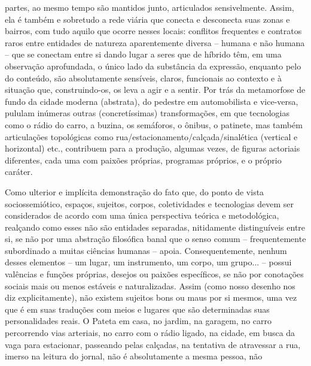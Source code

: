 \begin{multicols}{2}
partes,\allowbreak{} ao mesmo tempo são mantidos junto,\allowbreak{} articulados sensivelmente.\allowbreak{} Assim,\allowbreak{} ela é também e sobretudo a rede viária que conecta e desconecta suas zonas e bairros,\allowbreak{} com tudo aquilo que ocorre nesses locais:\allowbreak{} conflitos frequentes e contratos raros entre entidades de natureza aparentemente diversa – humana e não humana – que se conectam entre si dando lugar a seres que de híbrido têm,\allowbreak{} em uma observação aprofundada,\allowbreak{} o único lado da substância da expressão,\allowbreak{} enquanto pelo do conteúdo,\allowbreak{} são absolutamente sensíveis,\allowbreak{} claros,\allowbreak{} funcionais ao contexto e à situação que,\allowbreak{} construindo-\allowbreak{}os,\allowbreak{} os leva a agir e a sentir.\allowbreak{} Por trás da metamorfose de fundo da cidade moderna (\allowbreak{}abstrata)\allowbreak{},\allowbreak{} do pedestre em automobilista e vice-\allowbreak{}versa,\allowbreak{} pululam inúmeras outras (\allowbreak{}concretíssimas)\allowbreak{} transformações,\allowbreak{} em que tecnologias como o rádio do carro,\allowbreak{} a buzina,\allowbreak{} os semáforos,\allowbreak{} o ônibus,\allowbreak{} o patinete,\allowbreak{} mas também articulações topológicas como rua\fshyp{}estacionamento\fshyp{}calçada\fshyp{}sinalética (\allowbreak{}vertical e horizontal)\allowbreak{} etc.\allowbreak{},\allowbreak{} contribuem para a produção,\allowbreak{} algumas vezes,\allowbreak{} de figuras actoriais diferentes,\allowbreak{} cada uma com paixões próprias,\allowbreak{} programas próprios,\allowbreak{} e o próprio caráter.\allowbreak{}\par{}Como ulterior e implícita demonstração do fato que,\allowbreak{} do ponto de vista sociossemiótico,\allowbreak{} espaços,\allowbreak{} sujeitos,\allowbreak{} corpos,\allowbreak{} coletividades e tecnologias devem ser considerados de acordo com uma única perspectiva teórica e metodológica,\allowbreak{} realçando como esses não são entidades separadas,\allowbreak{} nitidamente distinguíveis entre si,\allowbreak{} se não por uma abstração filosófica banal que o senso comum – frequentemente subordinado a muitas ciências humanas – apoia.\allowbreak{} Consequentemente,\allowbreak{} nenhum desses elementos – um lugar,\allowbreak{} um instrumento,\allowbreak{} um corpo,\allowbreak{} um grupo.\allowbreak{}.\allowbreak{}.\allowbreak{} – possui valências e funções próprias,\allowbreak{} desejos ou paixões específicos,\allowbreak{} se não por conotações sociais mais ou menos estáveis e naturalizadas.\allowbreak{} Assim (\allowbreak{}como nosso desenho nos diz explicitamente)\allowbreak{},\allowbreak{} não existem sujeitos bons ou maus por si mesmos,\allowbreak{} uma vez que é em suas traduções com meios e lugares que são determinadas suas personalidades reais.\allowbreak{} O Pateta em casa,\allowbreak{} no jardim,\allowbreak{} na garagem,\allowbreak{} no carro percorrendo vias arteriais,\allowbreak{} no carro com o rádio ligado,\allowbreak{} na cidade,\allowbreak{} em busca da vaga para estacionar,\allowbreak{} passeando pelas calçadas,\allowbreak{} na tentativa de atravessar a rua,\allowbreak{} imerso na leitura do jornal,\allowbreak{} não é absolutamente a mesma pessoa,\allowbreak{} não 
\end{multicols}
